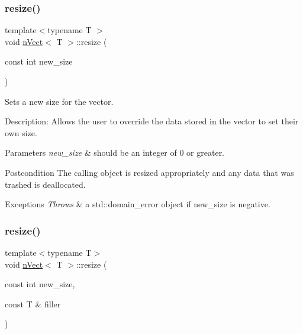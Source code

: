 \subsubsection{\texorpdfstring{resize()}{resize()}\hspace{0.1cm}{\footnotesize\ttfamily [1/2]}}
{\footnotesize\ttfamily template$<$typename T $>$ \\
void \hyperlink{classnVect}{n\+Vect}$<$ T $>$\+::resize (\begin{DoxyParamCaption}\item[{const int}]{new\+\_\+size }\end{DoxyParamCaption})}



Sets a new size for the vector. 

Description\+: Allows the user to override the data stored in the vector to set their own size. 
\begin{DoxyParams}{Parameters}
{\em new\+\_\+size} & should be an integer of 0 or greater. \\
\hline
\end{DoxyParams}
\begin{DoxyPostcond}{Postcondition}
The calling object is resized appropriately and any data that was trashed is deallocated. 
\end{DoxyPostcond}

\begin{DoxyExceptions}{Exceptions}
{\em Throws} & a std\+::domain\+\_\+error object if new\+\_\+size is negative. \\
\hline
\end{DoxyExceptions}
\mbox{\label{classnVect_a58dcec4cc5ea9d8d18e03fb1671bee2b}} 
\subsubsection{\texorpdfstring{resize()}{resize()}\hspace{0.1cm}{\footnotesize\ttfamily [2/2]}}
{\footnotesize\ttfamily template$<$typename T$>$ \\
void \hyperlink{classnVect}{n\+Vect}$<$ T $>$\+::resize (\begin{DoxyParamCaption}\item[{const int}]{new\+\_\+size,  }\item[{const T \&}]{filler }\end{DoxyParamCaption})}




